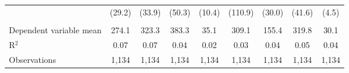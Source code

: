 \begin{adjustbox}{width = \textwidth, center}
\begin{tabular}{lcccccccc}
                              & (29.2)        & (33.9)        & (50.3)        & (10.4)        & (110.9)       & (30.0)        & (41.6)        & (4.5)\\   
       \\
      Dependent variable mean & 274.1         & 323.3         & 383.3         & 35.1          & 309.1         & 155.4         & 319.8         & 30.1\\  
      R$^2$                   & 0.07          & 0.07          & 0.04          & 0.02          & 0.03          & 0.04          & 0.05          & 0.04\\  
      Observations            & 1,134         & 1,134         & 1,134         & 1,134         & 1,134         & 1,134         & 1,134         & 1,134\\  
      \bottomrule
   \end{tabular}
\end{adjustbox}
\par\endgroup


